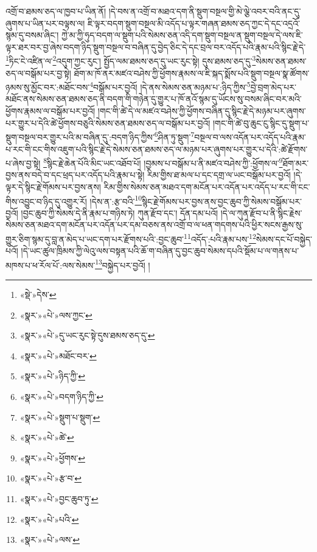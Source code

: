 འགྲོ་བ་ཐམས་ཅད་ལ་ཁྱབ་པ་ཡིན་ནོ། །དེ་བས་ན་འགྲོ་བ་མཐའ་དག་ནི་སྡུག་བསྔལ་གྱི་མེ་ལྕེ་འབར་བའི་ནང་དུ་ཞུགས་པ་ཡིན་པར་བལྟས་ལ། ཇི་ལྟར་བདག་སྡུག་བསྔལ་མི་འདོད་པ་ལྟར་གཞན་ཐམས་ཅད་ཀྱང་དེ་དང་འདྲའོ་སྙམ་དུ་བསམ་ཞིང་། ཀྱེ་མ་ཀྱི་ཧུད་བདག་ལ་སྡུག་པའི་སེམས་ཅན་འདི་དག་སྡུག་བསྔལ་ན་སྡུག་བསྔལ་དེ་ལས་ཇི་ལྟར་ཐར་བར་བྱ་ཞེས་བདག་ཉིད་སྡུག་བསྔལ་བ་བཞིན་དུ་བྱེད་ཅིང་དེ་དང་བྲལ་བར་འདོད་པའི་རྣམ་པའི་སྙིང་རྗེ་དེ་\footnote{«སྡེ་»དེས་}ཏིང་ངེ་འཛིན་ལ་\footnote{«སྣར་»«པེ་»ལས་ཀྱང་}འདུག་ཀྱང་རུང་། སྤྱོད་ལམ་ཐམས་ཅད་དུ་ཡང་རུང་སྟེ། དུས་ཐམས་ཅད་དུ་\footnote{«སྣར་»«པེ་»དུ་ཡང་རུང་སྟེ་དུས་ཐམས་ཅད་དུ་}སེམས་ཅན་ཐམས་ཅད་ལ་བསྒོམ་པར་བྱ་སྟེ། ཐོག་མ་ཁོ་ནར་མཛའ་བཤེས་ཀྱི་ཕྱོགས་རྣམས་ལ་ཇི་སྐད་སྨོས་པའི་སྡུག་བསྔལ་སྣ་ཚོགས་ཉམས་སུ་མྱོང་བར་:མཐོང་བས་\footnote{«སྣར་»«པེ་»མཐོང་བར་}བསྒོམ་པར་བྱའོ། །དེ་ནས་སེམས་ཅན་མཉམ་པ་:ཉིད་ཀྱིས་\footnote{«སྣར་»«པེ་»ཉིད་ཀྱི་}བྱེ་བྲག་མེད་པར་མཐོང་ནས་སེམས་ཅན་ཐམས་ཅད་ནི་བདག་གི་གཉེན་དུ་གྱུར་པ་ཁོ་ནའོ་སྙམ་དུ་ཡོངས་སུ་བསམ་ཞིང་བར་མའི་ཕྱོགས་རྣམས་ལ་བསྒོམ་པར་བྱའོ། །གང་གི་ཚེ་དེ་ལ་མཛའ་བཤེས་ཀྱི་ཕྱོགས་བཞིན་དུ་སྙིང་རྗེ་དེ་མཉམ་པར་ཞུགས་པར་གྱུར་པ་དེའི་ཚེ་ཕྱོགས་བཅུའི་སེམས་ཅན་ཐམས་ཅད་ལ་བསྒོམ་པར་བྱའོ། །གང་གི་ཚེ་བུ་ཆུང་ངུ་སྙིང་དུ་སྡུག་པ་སྡུག་བསྔལ་བར་གྱུར་པའི་མ་བཞིན་དུ་:བདག་ཉིད་ཀྱིས་\footnote{«སྣར་»«པེ་»བདག་ཉིད་ཀྱི་}ཤིན་ཏུ་སྡུག་\footnote{«སྣར་»«པེ་»སྡུག་པ་སྡུག་}བསྔལ་བ་ལས་འདོན་པར་འདོད་པའི་རྣམ་པ་རང་གི་ངང་གིས་འཇུག་པའི་སྙིང་རྗེ་དེ་སེམས་ཅན་ཐམས་ཅད་ལ་མཉམ་པར་ཞུགས་པར་གྱུར་པ་དེའི་:ཚེ་རྫོགས་པ་ཞེས་བྱ་སྟེ། \footnote{«སྣར་»«པེ་»ཚེ་}སྙིང་རྗེ་ཆེན་པོའི་མིང་ཡང་འཐོབ་པོ། །བྱམས་པ་བསྒོམ་པ་ནི་མཛའ་བཤེས་ཀྱི་:ཕྱོགས་ལ་\footnote{«སྣར་»«པེ་»ཕྱོགས་}ཐོག་མར་བྱས་ནས་བདེ་བ་དང་ཕྲད་པར་འདོད་པའི་རྣམ་པ་སྟེ། རིམ་གྱིས་ཐ་མལ་པ་དང་དགྲ་ལ་ཡང་བསྒོམ་པར་བྱའོ། །དེ་ལྟར་དེ་སྙིང་རྗེ་གོམས་པར་བྱས་ནས། རིམ་གྱིས་སེམས་ཅན་མཐའ་དག་མངོན་པར་འདོན་པར་འདོད་པ་རང་གི་ངང་གིས་འབྱུང་བ་ཉིད་དུ་འགྱུར་རོ། །དེས་ན་:རྩ་བའི་\footnote{«སྣར་»«པེ་»རྩ་བ་}སྙིང་རྗེ་གོམས་པར་བྱས་ནས་བྱང་ཆུབ་ཀྱི་སེམས་བསྒོམ་པར་བྱའོ། །བྱང་ཆུབ་ཀྱི་སེམས་དེ་ནི་རྣམ་པ་གཉིས་ཏེ། ཀུན་རྫོབ་དང་། དོན་དམ་པའོ། །དེ་ལ་ཀུན་རྫོབ་པ་ནི་སྙིང་རྗེས་སེམས་ཅན་མཐའ་དག་མངོན་པར་འདོན་པར་དམ་བཅས་ནས་འགྲོ་བ་ལ་ཕན་གདགས་པའི་ཕྱིར་སངས་རྒྱས་སུ་གྱུར་ཅིག་སྙམ་དུ་བླ་ན་མེད་པ་ཡང་དག་པར་རྫོགས་པའི་:བྱང་ཆུབ་\footnote{«སྣར་»«པེ་»བྱང་ཆུབ་ཏུ་}འདོད་:པའི་རྣམ་པས་\footnote{«སྣར་»«པེ་»པའི་}སེམས་དང་པོ་བསྐྱེད་པའོ། །དེ་ཡང་ཚུལ་ཁྲིམས་ཀྱི་ལེའུ་ལས་བསྟན་པའི་ཆོ་ག་བཞིན་དུ་བྱང་ཆུབ་སེམས་དཔའི་སྡོམ་པ་ལ་གནས་པ་མཁས་པ་ཕ་རོལ་པོ་:ལས་སེམས་\footnote{«སྣར་»«པེ་»ལས་}བསྐྱེད་པར་བྱའོ། །
